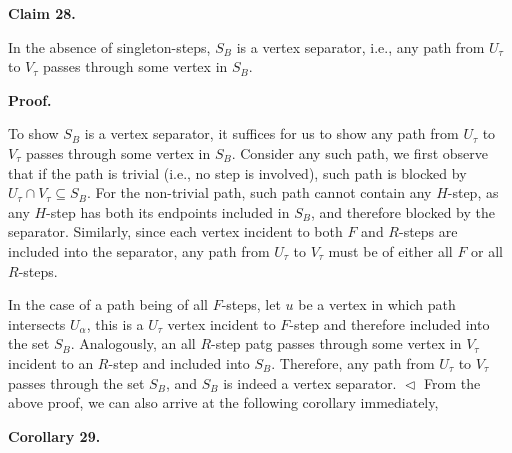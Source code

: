 \documentclass[10pt,a4paper]{article}
\begin{document}


\par\medskip\noindent\textbf{
Claim 28. 
}\par



In the absence of singleton-steps, $S_{B}$ is a vertex separator, i.e., any path from $U_{\tau}$ to $V_{\tau}$ passes through some vertex in $S_{B}$.\par






\par\medskip\noindent\textbf{
\textbf{Proof}.}\par




To show $S_{B}$ is a vertex separator, it suffices for us to show any path from $U_{\tau}$ to $V_{\tau}$ passes through some vertex in $S_{B}$.
Consider any such path, we first observe that if the path is trivial (i.e., no step is involved), such path is blocked by $U_{\tau}\cap V_{\tau}\subseteq S_{B}$. For the non-trivial path, such path cannot contain any $H$-step, as any $H$-step has both its endpoints included in $S_{B}$, and therefore blocked by the separator. Similarly, since each vertex incident to both $F$ and $R$-steps are included into the separator, any path from $U_{\tau}$ to $V_{\tau}$ must be of either all $F$ or all $R$-steps.\par




In the case of a path being of all $F$-steps, let $u$ be a vertex in which path intersects $U_{\alpha}$, this is a $U_{\tau}$ vertex incident to $F$-step and therefore included into the set $S_{B}$. Analogously, an all $R$-step patg passes through some vertex in $V_{\tau}$ incident to an $R$-step and included into $S_{B}$. Therefore, any path from $U_{\tau}$ to $V_{\tau}$ passes through the set $S_{B}$, and $S_{B}$ is indeed a vertex separator.
$\vartriangleleft$
From the above proof, we can also arrive at the following corollary immediately,\par





\par\medskip\noindent\textbf{
\textbf{Corollary 29}\textbf{.}
}\par
\end{document}

